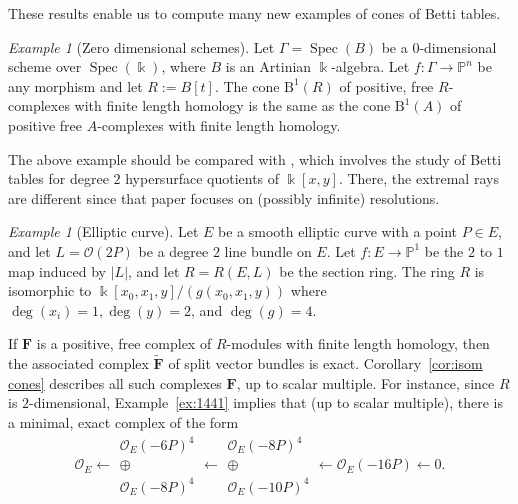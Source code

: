 \documentclass[12pt]{amsart}
\theoremstyle{definition}
\theoremstyle{remark}
\newtheorem{example}[lemma]{Example}
\newcommand{\Spec}{\operatorname{Spec}}
\newcommand{\kk}{\Bbbk}
\newcommand{\PP}{\mathbb{P}}
\newcommand{\cO}{\mathcal{O}}
\newcommand{\FF}{\mathbf{F}}
\newcommand{\BBQ}{\mathrm{B}}
\begin{document}
These results enable us to compute many new examples of cones of Betti tables.

\begin{example}[Zero dimensional schemes]\label{ex:zero dim}Let $\Gamma=\Spec(B)$ be a $0$-dimensional scheme over $\Spec(\kk)$, where $B$ is an Artinian $\kk$-algebra.  Let $f\colon \Gamma\to \PP^n$ be any morphism and let $R:=B[t]$.  The cone $\BBQ^1(R)$ of positive, free $R$-complexes with finite length homology is the same as the cone $\BBQ^1(A)$ of positive free $A$-complexes with finite length homology.  
\end{example}

The above example should be compared with \cite[Theorem~1.2]{bbeg}, which involves the study of Betti tables for degree $2$ hypersurface quotients of $\kk[x,y]$.  There, the extremal rays are different since that paper focuses on (possibly infinite) resolutions.

\begin{example}[Elliptic curve]
Let $E$ be a smooth elliptic curve with a point $P\in E$, and let $L=\cO(2P)$ be a degree $2$ line bundle on $E$.  Let $f\colon E\to \PP^1$ be the $2$ to $1$ map induced by $|L|$, and let $R=R(E,L)$ be the section ring.  The ring $R$ is isomorphic to $\kk[x_0,x_1,y]/(g(x_0,x_1,y))$ where $\deg(x_i)=1,\deg(y)=2$, and $\deg(g)=4$.

If $\FF$ is a positive, free complex of $R$-modules with finite length homology, then the associated complex $\widetilde{\FF}$ of split vector bundles is exact.  Corollary~\ref{cor:isom cones} describes all such complexes $\FF$, up to scalar multiple.
For instance, since $R$ is $2$-dimensional, Example~\ref{ex:1441} implies that (up to scalar multiple), there is a minimal, exact complex of the form
\[
\cO_E\longleftarrow \begin{matrix}  \cO_E(-6P)^4\\ \oplus\\ \cO_E(-8P)^4\end{matrix}\longleftarrow \begin{matrix}  \cO_E(-8P)^4\\ \oplus\\ \cO_E(-10P)^4\end{matrix} \longleftarrow \cO_E(-16P)\longleftarrow 0.
\]
\end{example}
\end{document}
